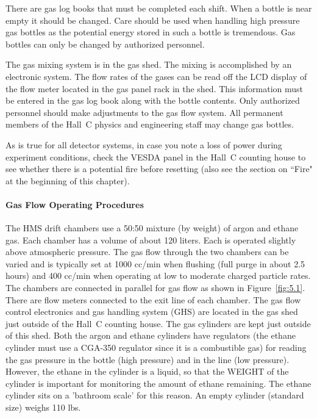There are gas log books that must be completed each shift.
When a bottle is near empty it should be changed.
Care should be used when handling high pressure gas bottles as the
potential energy stored in such a bottle is tremendous.
Gas bottles can only be changed by authorized personnel.

The gas mixing system is in the gas shed. The mixing is accomplished
by an electronic system. The flow rates of the gases can be read off the
LCD display of the flow meter located in the gas panel rack in the shed.
This information must be entered in the gas log book along with the bottle contents.
Only authorized personnel should make adjustments to the gas flow system.
All permanent members
of the Hall~C physics and engineering staff may change gas bottles.

As is true for all detector systems, in case you note a loss of power
during experiment conditions, check the VESDA panel in the Hall~C counting
house to see whether there is a potential fire before resetting (also
see the section on ``Fire" at the beginning of this chapter).

\paragraph {Gas Flow Operating Procedures}

The HMS drift chambers use a 50:50 mixture (by weight) of argon and
ethane gas.  Each chamber has a volume of about 120 liters.  Each is
operated slightly above atmospheric pressure.  The gas flow through
the two chambers can be varied and is typically set at 1000 cc/min
when flushing (full purge in about 2.5 hours) and 400 cc/min when operating
at low to moderate charged particle rates.  The chambers are connected
in parallel for gas flow as shown in Figure~\ref{fig:5.1}.  There are flow meters
connected
to the exit line of each chamber.  The gas flow control electronics
and gas handling system (GHS) are located in the gas shed just outside
of the Hall~C counting house.  The gas cylinders are kept just outside of
this shed.  Both the argon and ethane cylinders have regulators (the ethane
cylinder must use a CGA-350 regulator since it is a combustible gas) for
reading the gas pressure in the bottle (high pressure) and in the line (low
pressure).  However, the ethane
in the cylinder is a liquid, so that the WEIGHT of the cylinder is important
for monitoring the amount of ethane remaining.  The ethane
cylinder sits on a 'bathroom scale' for this reason.  An empty cylinder
(standard size) weighs 110 lbs.

